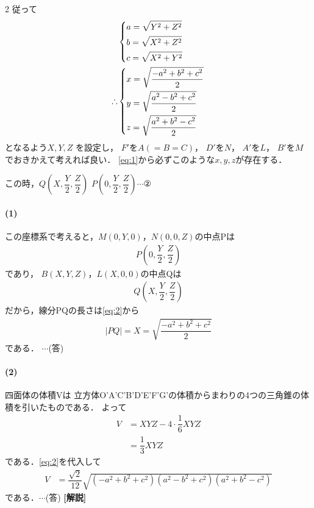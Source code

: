 \documentclass[../../main.tex]{subfiles}
\begin{document}
\begin{multicols}{2}
  従って
  \begin{align}
    &
    \begin{dcases}
      a = \sqrt{Y^2+Z^2} \\
      b = \sqrt{X^2+Z^2} \\
      c = \sqrt{X^2+Y^2}
    \end{dcases}                 \\
    \therefore
    &
    \begin{dcases}
      x = \sqrt{\dfrac{-a^2+b^2+c^2}{2}} \\
      y = \sqrt{\dfrac{a^2-b^2+c^2}{2}}  \\
      z = \sqrt{\dfrac{a^2+b^2-c^2}{2}}
    \end{dcases} \label{eq:2}
  \end{align}
  となるよう$X,Y,Z$ を設定し，
  $F'$を$A(=B=C)$，
  $D'$を$N$，
  $A'$を$L$，
  $B'$を$M$
  でおきかえて考えれば良い．
  \cref{eq:1}から必ずこのような$x,y,z$が存在する．

  この時，$Q (X, \dfrac{Y}{2}, \dfrac{Z}{2})$
  $P (0, \dfrac{Y}{2}, \dfrac{Z}{2}) \cdots ②$

  \paragraph{(1)}
  この座標系で考えると，$M(0,Y,0)$，$N(0,0,Z)$の中点Pは
  \begin{align}
    P\left(0,\dfrac{Y}{2},\dfrac{Z}{2}\right)
  \end{align}
  であり，
  $B(X,Y,Z)$，$L(X,0,0)$の中点Qは
  \begin{align}
    Q\left(X,\dfrac{Y}{2},\dfrac{Z}{2}\right)
  \end{align}
  だから，線分PQの長さは\cref{eq:2}から
  \begin{align}
    |PQ| = X = \sqrt{\dfrac{-a^2+b^2+c^2}{2}}
  \end{align}
  である．  $\cdots$(答)

  \paragraph{(2)}
  四面体の体積Vは 立方体O'A'C'B'D'E'F'G'の体積からまわりの4つの三角錐の体積を引いたものである．
  よって
  \begin{align}
    V
    & = XYZ - 4 \cdot \dfrac{1}{6}XYZ \\
    & = \dfrac{1}{3}XYZ
  \end{align}
  である．\cref{eq:2}を代入して
  \begin{align}
    V
    & = \dfrac{\sqrt{2}}{12} \sqrt{(-a^2+b^2+c^2)(a^2-b^2+c^2)(a^2+b^2-c^2)}
  \end{align}
  である．$\cdots$(答)
  {\bf [解説]}

  \newpage
\end{multicols}
\end{document}
